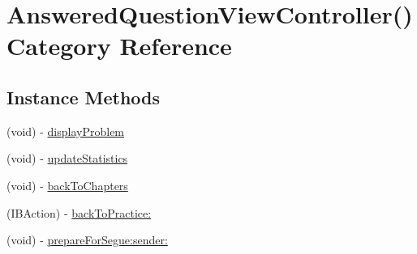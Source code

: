 \hypertarget{category_answered_question_view_controller_07_08}{\section{Answered\-Question\-View\-Controller() Category Reference}
\label{category_answered_question_view_controller_07_08}
}
\subsection*{Instance Methods}
\begin{DoxyCompactItemize}
\item 
(void) -\/ \hyperlink{category_answered_question_view_controller_07_08_ae36be9f996a1e55f0729d11a529da4e0}{display\-Problem}
\item 
(void) -\/ \hyperlink{category_answered_question_view_controller_07_08_a95b3e32e3365fde4bb0b77e7a5900805}{update\-Statistics}
\item 
(void) -\/ \hyperlink{category_answered_question_view_controller_07_08_a47905746228631a6f4a46a3bf6d9648c}{back\-To\-Chapters}
\item 
(I\-B\-Action) -\/ \hyperlink{category_answered_question_view_controller_07_08_a9a0dde59babba4ba92ca93dfe9583472}{back\-To\-Practice\-:}
\item 
(void) -\/ \hyperlink{category_answered_question_view_controller_07_08_a10da7f7695ab2490fcb822a0620bb1a6}{prepare\-For\-Segue\-:sender\-:}
\end{DoxyCompactItemize}


